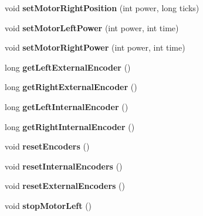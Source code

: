 \begin{DoxyCompactItemize}
\mbox{\label{classAsservDriver_a62a57e92e4933413d9c3c6b62f496ef3}} 
void {\bfseries set\+Motor\+Right\+Position} (int power, long ticks)
\item 
\mbox{\label{classAsservDriver_a3b702233fa09a657bb03372470152376}} 
void {\bfseries set\+Motor\+Left\+Power} (int power, int time)
\item 
\mbox{\label{classAsservDriver_a54e742670bae9a19dc70b982cad4c3ba}} 
void {\bfseries set\+Motor\+Right\+Power} (int power, int time)
\item 
\mbox{\label{classAsservDriver_aa6924c9da7428d59fa712c15221dfbac}} 
long {\bfseries get\+Left\+External\+Encoder} ()
\item 
\mbox{\label{classAsservDriver_afda042c513d96188f8572899679cc616}} 
long {\bfseries get\+Right\+External\+Encoder} ()
\item 
\mbox{\label{classAsservDriver_a01959c5fd48ed61fedfb22a6c3605ea2}} 
long {\bfseries get\+Left\+Internal\+Encoder} ()
\item 
\mbox{\label{classAsservDriver_a00e162296e20e589d7117b2427908aa6}} 
long {\bfseries get\+Right\+Internal\+Encoder} ()
\item 
\mbox{\label{classAsservDriver_a1d4095fd5abc9597f5aa35fc4d02f3fa}} 
void {\bfseries reset\+Encoders} ()
\item 
\mbox{\label{classAsservDriver_a9375c998721a68c0fcdd1c538642fdc6}} 
void {\bfseries reset\+Internal\+Encoders} ()
\item 
\mbox{\label{classAsservDriver_a62108360983265520b0401a71f810f6a}} 
void {\bfseries reset\+External\+Encoders} ()
\item 
\mbox{\label{classAsservDriver_a69fb8c78d0ced7bd7f330c18952c84f4}} 
void {\bfseries stop\+Motor\+Left} ()
\item 
\mbox{\label{classAsservDriver_ab24bc1636143db604ecbad3b18a17c8c}} 

\end{DoxyCompactItemize}
